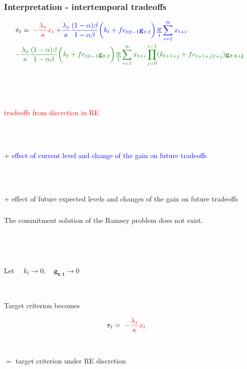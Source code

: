 \documentclass[11pt]{beamer}
\DeclareMathOperator{\E}{\mathbb{E}}
\begin{document}
\begin{frame}
	\frametitle{Interpretation - intertemporal tradeoffs}
\small{
\begin{align*}
& \pi_t  =  \; \textcolor{red}{-\frac{\lambda_x}{\kappa} x_t} \textcolor{blue}{ \; + \frac{\lambda_x}{\kappa} \frac{(1-\alpha)\beta}{1-\alpha\beta} \bigg(k_t+ fe_{t|t-1}\mathbf{g}_{\pi,t} \bigg)\E_t\sum_{i=1}^{\infty}x_{t+i}}  \\
& \textcolor{mygreen}{- \frac{\lambda_x}{\kappa} \frac{(1-\alpha)\beta}{1-\alpha\beta} \bigg(k_t+ fe_{t|t-1}\mathbf{g}_{\pi,t} \bigg)\E_t\sum_{i=1}^{\infty}x_{t+i}\prod_{j=0}^{i-1}(k_{t+1+j}+ fe_{t+1+j|t+j})\mathbf{g_{\bar{\pi},t+j}} }
\end{align*}

\

\

\textcolor{red}{tradeoffs from discretion in RE} \\

\

\

+ \textcolor{blue}{effect of current level and change of the gain on future tradeoffs} \\

\

\

+ \textcolor{mygreen}{effect of future expected levels and changes of the gain on future tradeoffs}
}
\end{frame}

\begin{frame}
	\frametitle{}
	\label{no_commitment}

\begin{lemma} The commitment solution of the Ramsey problem does not exist. 
\end{lemma}

\

\

Let $\quad k_t \rightarrow 0, \quad \mathbf{g_{z,t}} \rightarrow 0$

\

Target criterion becomes

\begin{align}
& \pi_t  =  \; \textcolor{red}{-\frac{\lambda_x}{\kappa} x_t} 
\end{align}

\

$=$ target criterion under RE discretion

\hfill \hyperlink{no_commitment_intuition}{}


\end{frame}
\end{document}
